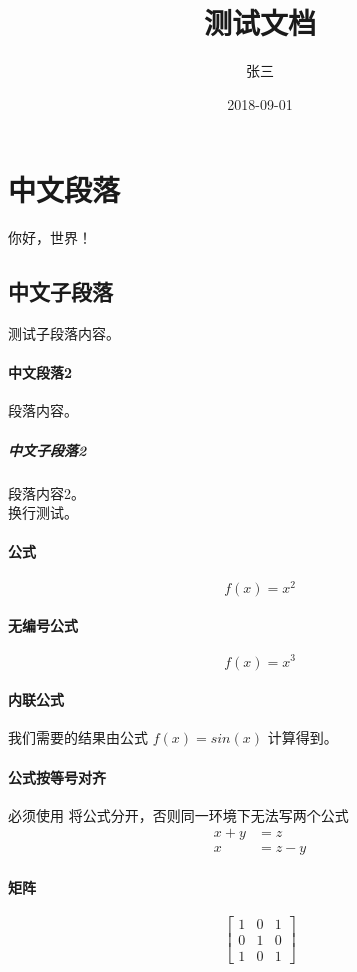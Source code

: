 \documentclass{article}
\title{测试文档}
\date{2018-09-01}
\author{张三}
\begin{document}
        \maketitle
        \newpage
        \tableofcontents
        \newpage
        \section{中文段落}
        你好，世界！
        \subsection{中文子段落}
        测试子段落内容。
        \paragraph{中文段落2}
        段落内容。
        \subparagraph{中文子段落2}
        段落内容2。\\
        换行测试。
        \paragraph{公式}
        \begin{equation}
            f(x) = x^2
        \end{equation}
        \paragraph{无编号公式}
        \begin{equation*}
            f(x) = x^3
        \end{equation*}
        \paragraph{内联公式}
        我们需要的结果由公式 $f(x)=sin(x)$ 计算得到。
        \paragraph{公式按等号对齐}
        必须使用  将公式分开，否则同一环境下无法写两个公式
        \begin{align*}
            x + y &= z\\
            x &= z - y
        \end{align*}
        \paragraph{矩阵}
        \begin{equation}
            \left[
            \begin{matrix}
                1 & 0 & 1\\
                0 & 1 & 0\\
                1 & 0 & 1
            \end{matrix}
            \right]
        \end{equation}
\end{document}
